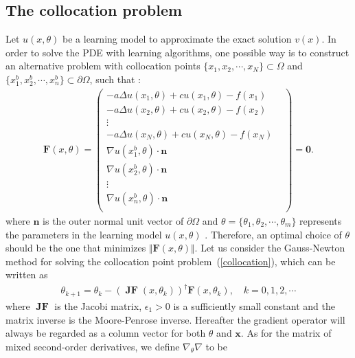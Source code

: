 \documentclass[a4paper, 11pt]{article}
\numberwithin{equation}{section}
\begin{document}
\subsection{The collocation problem}
\quad \quad Let $u(x,\theta)$ be a learning model to approximate the exact solution $v(x)$. In order to solve the PDE with learning algorithms, one possible way is to construct an alternative problem with collocation points $\lbrace x_1,x_2,\cdots, x_N \rbrace \subset \Omega$ and $\lbrace x^b_1, x^b_2, \cdots, x^b_n \rbrace \subset \partial \Omega$, such that :
\begin{align}\label{collocation}
\boldsymbol{F}(x, \theta) = 
\begin{pmatrix}
-a\Delta u(x_1,\theta) + cu(x_1,\theta) - f(x_1) & \\
-a\Delta u(x_2,\theta) + cu(x_2,\theta) - f(x_2) & \\
\vdots & \\
-a\Delta u(x_N,\theta) + cu(x_N,\theta) - f(x_N) & \\
\nabla u(x_1^b,\theta) \cdot \boldsymbol{n} & \\
\nabla u(x_2^b,\theta) \cdot \boldsymbol{n} & \\
\vdots & \\
\nabla u(x_n^b,\theta) \cdot \boldsymbol{n} & \\
\end{pmatrix} = \boldsymbol{0}.
\end{align}
where $\boldsymbol{n}$ is the outer normal unit vector of $\partial \Omega$ and $\theta =\lbrace \theta_1, \theta_2,\cdots, \theta_m \rbrace$ represents the parameters in the learning model $u(x,\theta)$ . Therefore, an optimal choice of $\theta$ should be the one that minimizes $\Vert \boldsymbol{F}(x,\theta) \Vert$. Let us consider the Gauss-Newton method for solving the collocation point problem~(\ref{collocation}), which can be written as
\begin{align}\label{colloIter}
\theta_{k+1} = \theta_k - (\boldsymbol{\operatorname{JF}} (x,\theta_k))^{\dagger}  \boldsymbol{F}(x,\theta_k),\quad k=0,1,2,\cdots
\end{align}
where $\boldsymbol{\operatorname{JF}} $ is the Jacobi matrix, $\epsilon_1>0$ is a sufficiently small constant and the matrix inverse is the Moore-Penrose inverse. Hereafter the gradient operator will always be regarded as a column vector for both  $\theta$ and  $\boldsymbol{x}$. As for the matrix of mixed second-order derivatives, we define $\nabla_{\theta} \nabla$ to be
\end{document}
